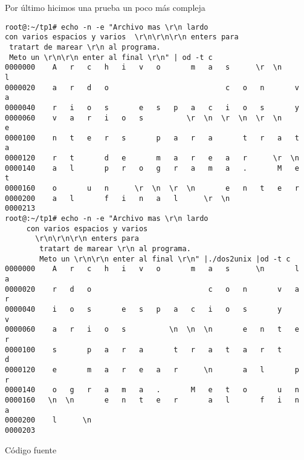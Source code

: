 \documentclass[a4paper,11pt]{article}
\begin{document}
Por \'ultimo hicimos una prueba un poco m\'as compleja
\begin{verbatim}
root@:~/tp1# echo -n -e "Archivo mas \r\n lardo      
con varios espacios y varios  \r\n\r\n\r\n enters para
 tratart de marear \r\n al programa. 
 Meto un \r\n\r\n enter al final \r\n" | od -t c
0000000    A   r   c   h   i   v   o       m   a   s      \r  \n       l
0000020    a   r   d   o                           c   o   n       v   a
0000040    r   i   o   s       e   s   p   a   c   i   o   s       y    
0000060    v   a   r   i   o   s          \r  \n  \r  \n  \r  \n       e
0000100    n   t   e   r   s       p   a   r   a       t   r   a   t   a
0000120    r   t       d   e       m   a   r   e   a   r      \r  \n    
0000140    a   l       p   r   o   g   r   a   m   a   .       M   e   t
0000160    o       u   n      \r  \n  \r  \n       e   n   t   e   r    
0000200    a   l       f   i   n   a   l      \r  \n                    
0000213
root@:~/tp1# echo -n -e "Archivo mas \r\n lardo 
     con varios espacios y varios
       \r\n\r\n\r\n enters para
        tratart de marear \r\n al programa. 
        Meto un \r\n\r\n enter al final \r\n" |./dos2unix |od -t c
0000000    A   r   c   h   i   v   o       m   a   s      \n       l   a
0000020    r   d   o                           c   o   n       v   a   r
0000040    i   o   s       e   s   p   a   c   i   o   s       y       v
0000060    a   r   i   o   s          \n  \n  \n       e   n   t   e   r
0000100    s       p   a   r   a       t   r   a   t   a   r   t       d
0000120    e       m   a   r   e   a   r      \n       a   l       p   r
0000140    o   g   r   a   m   a   .       M   e   t   o       u   n    
0000160   \n  \n       e   n   t   e   r       a   l       f   i   n   a
0000200    l      \n                                                    
0000203
\end{verbatim}

{C\'odigo fuente}
\end{document}
